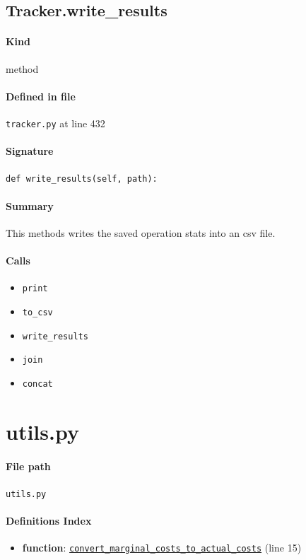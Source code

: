 \documentclass[11pt]{report}
\begin{document}
\subsection{Tracker.write\_results}
\label{def:tracker.py:Tracker.write_results:L432}
\paragraph{Kind} method
\paragraph{Defined in file} \texttt{tracker.py} at line 432
\paragraph{Signature} \texttt{def write\_results(self, path):}
\paragraph{Summary} This methods writes the saved operation stats into an csv file.
\paragraph{Calls}
\begin{itemize}[leftmargin=*]
  \item \texttt{print}
  \item \texttt{to\_csv}
  \item \texttt{write\_results}
  \item \texttt{join}
  \item \texttt{concat}
\end{itemize}

\section{utils.py}
\label{file:utils.py}
\paragraph{File path} \texttt{utils.py}
\paragraph{Definitions Index}
\begin{itemize}[leftmargin=*]
  \item \textbf{function}: \hyperref[def:utils.py:convert_marginal_costs_to_actual_costs:L15]{\texttt{convert\_marginal\_costs\_to\_actual\_costs}} (line 15)
\end{itemize}
\end{document}
